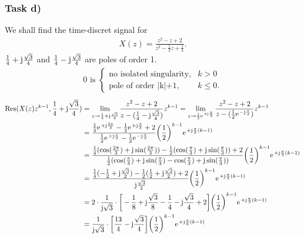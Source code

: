 \subsubsection{Task d)}
We shall find the time-discret signal for
\begin{align}
	X(z)=\frac{z^2-z+2}{z^2-\frac{1}{2}z+\frac{1}{4}}.
\end{align}
$\frac{1}{4}+\im\frac{\sqrt{3}}{4}$ and $\frac{1}{4}-\im\frac{\sqrt{3}}{4}$ are poles of order 1.
\begin{align}
	0 \text{ is }\begin{cases}
		\text{no isolated singularity}, &k>0 \\
		\text{pole of order |k|+1}, &k\leq 0.
	\end{cases}
\end{align}
\begin{align}
	\mathrm{Res}(X(z)z^{k-1},\frac{1}{4}+\im\frac{\sqrt{3}}{4})&=\lim\limits_{z\rightarrow\frac{1}{4}+\im\frac{\sqrt{3}}{4}}\frac{z^2-z+2}{z-(\frac{1}{4}-\im\frac{\sqrt{3}}{4})}z^{k-1}=\lim\limits_{z\rightarrow\frac{1}{2}\e^{+\im\frac{\pi}{3}}}\frac{z^2-z+2}{z-(\frac{1}{2}\e^{-\im\frac{\pi}{3}})}z^{k-1}\nonumber\\
	&=\frac{\frac{1}{4}\e^{+\im\frac{2\pi}{3}}-\frac{1}{2}\e^{+\im\frac{\pi}{3}}+2}{\frac{1}{2}\e^{+\im\frac{\pi}{3}}-\frac{1}{2}\e^{-\im\frac{\pi}{3}}}\bigg(\frac{1}{2}\bigg )^{k-1}\e^{+\im\frac{\pi}{3}(k-1)}\nonumber\\
	&=\frac{\frac{1}{4}(\cos(\frac{2\pi}{3})+\im\sin(\frac{2\pi}{3}))-\frac{1}{2}(\cos(\frac{\pi}{3})+\im\sin(\frac{\pi}{3}))+2}{\frac{1}{2}(\cos(\frac{\pi}{3})+\im\sin(\frac{\pi}{3})-\cos(\frac{\pi}{3})+\im\sin(\frac{\pi}{3}))}\bigg(\frac{1}{2}\bigg )^{k-1}\e^{+\im\frac{\pi}{3}(k-1)}\nonumber\\
	&=\frac{\frac{1}{4}(-\frac{1}{2}+\im\frac{\sqrt{3}}{2})-\frac{1}{2}(\frac{1}{2}+\im\frac{\sqrt{3}}{2})+2}{\im\frac{\sqrt{3}}{2}}\bigg(\frac{1}{2}\bigg )^{k-1}\e^{+\im\frac{\pi}{3}(k-1)}\nonumber\\
	&=2\cdot\frac{1}{\im\sqrt{3}}\cdot\bigg [-\frac{1}{8}+\im\frac{\sqrt{3}}{8}-\frac{1}{4}-\im\frac{\sqrt{3}}{4}+2\bigg]\bigg(\frac{1}{2}\bigg )^{k-1}\e^{+\im\frac{\pi}{3}(k-1)}\nonumber\\
	&=\frac{1}{\im\sqrt{3}}\cdot\bigg [\frac{13}{4}-\im\frac{\sqrt{3}}{4}\bigg]\bigg(\frac{1}{2}\bigg)^{k-1}\e^{+\im\frac{\pi}{3}(k-1)}
\end{align}
